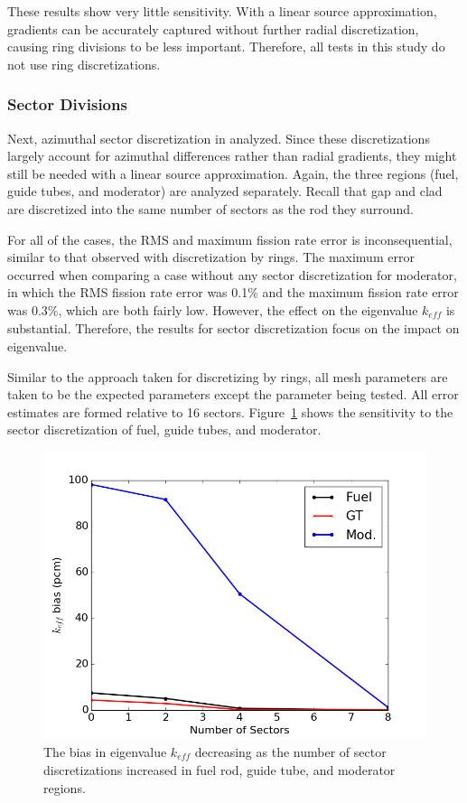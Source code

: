 These results show very little sensitivity. With a linear source approximation, gradients can be accurately captured without further radial discretization, causing ring divisions to be less important. Therefore, all tests in this study do not use ring discretizations. 

\subsubsection{Sector Divisions}

Next, azimuthal sector discretization in analyzed. Since these  discretizations largely account for azimuthal differences rather than radial gradients, they might still be needed with a linear source approximation. Again, the three regions (fuel, guide tubes, and moderator) are analyzed separately. Recall that gap and clad are discretized into the same number of sectors as the rod they surround.

For all of the cases, the \ac{RMS} and maximum fission rate error is inconsequential, similar to that observed with discretization by rings.  The maximum error occurred when comparing a case without any sector discretization for moderator, in which the \ac{RMS} fission rate error was 0.1\% and the maximum fission rate error was 0.3\%, which are both fairly low. However, the effect on the eigenvalue $k_{\textit{eff}}$ is substantial. Therefore, the results for sector discretization focus on the impact on eigenvalue.

Similar to the approach taken for discretizing by rings, all mesh parameters are taken to be the expected parameters except the parameter being tested. All error estimates are formed relative to 16 sectors. Figure~\ref{fig:comb-sectors} shows the sensitivity to the sector discretization of fuel, guide tubes, and moderator.

\begin{figure}[h!]
	\centering
	\includegraphics[width=0.7\linewidth]{figures/results/sensitivity/comb_sectors.png}
	\caption[]{The bias in eigenvalue $k_{\textit{eff}}$ decreasing as the number of sector discretizations increased in fuel rod, guide tube, and moderator regions.}
	\label{fig:comb-sectors}
\end{figure}


